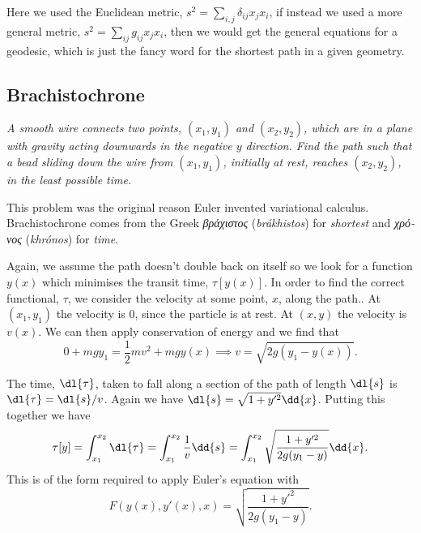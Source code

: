 \documentclass[fleqn]{NotesClass}
\begin{document}
    Here we used the Euclidean metric, \(s^2 = \sum_{i,j}\delta_{ij}x_jx_i\), if instead we used a more general metric, \(s^2 = \sum_{ij} g_{ij}x_jx_i\), then we would get the general equations for a geodesic, which is just the fancy word for the shortest path in a given geometry.
    
    \subsection{Brachistochrone}
    \textit{A smooth wire connects two points, \((x_1, y_1)\) and \((x_2, y_2)\), which are in a plane with gravity acting downwards in the negative \(y\) direction. Find the path such that a bead sliding down the wire from \((x_1, y_1)\), initially at rest, reaches \((x_2, y_2)\), in the least possible time.}
    
    \begin{rmk}
        This problem was the original reason Euler invented variational calculus.
        Brachistochrone comes from the Greek \textit{\textgreek{βράχιστος}} (\textit{brákhistos}) for \textit{shortest} and \textit{\textgreek{χρόνος}} (\textit{khrónos}) for \textit{time}.
    \end{rmk}
    
    Again, we assume the path doesn't double back on itself so we look for a function \(y(x)\) which minimises the transit time, \(\tau[y(x)]\).
    In order to find the correct functional, \(\tau\), we consider the velocity at some point, \(x\), along the path..
    At \((x_1, y_1)\) the velocity is \(0\), since the particle is at rest.
    At \((x, y)\) the velocity is \(v(x)\).
    We can then apply conservation of energy and we find that
    \begin{equation}
        0 + mgy_1 = \frac{1}{2}mv^2 + mgy(x) \implies v = \sqrt{2g (y_1 - y(x))}.
    \end{equation}
    
    The time, \(\dl{\tau}\), taken to fall along a section of the path of length \(\dl{s}\) is \(\dl{\tau} = \dl{s}/v\).
    Again we have \(\dl{s} = \sqrt{1 + y'^2}\dd{x}\).
    Putting this together we have
    \begin{equation}
        \tau[y] = \int_{x_1}^{x_2} \dl{\tau} = \int_{x_1}^{x_2} \frac{1}{v}\dd{s} = \int_{x_1}^{x_2} \sqrt{\frac{1 + y'^2}{2g(y_1 - y)}} \dd{x}.
    \end{equation}
    This is of the form required to apply Euler's equation with
    \begin{equation}
        F(y(x), y'(x), x) = \sqrt{\frac{1 + y'^2}{2g(y_1 - y)}}.
    \end{equation}
    
\end{document}
